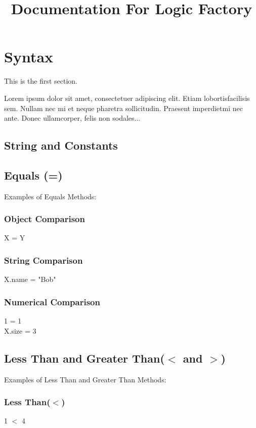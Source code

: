 \documentclass{article}
\title{Documentation For Logic Factory}
\date{ }
\begin{document}
	\maketitle
	\tableofcontents
	\newpage
	
	\section{Syntax}
	
	This is the first section.
	
	Lorem  ipsum  dolor  sit  amet,  consectetuer  adipiscing  
	elit.   Etiam  lobortisfacilisis sem.  Nullam nec mi et 
	neque pharetra sollicitudin.  Praesent imperdietmi nec ante. 
	Donec ullamcorper, felis non sodales...

	\subsection{String and Constants}
	
	\subsection{Equals (=)}
	Examples of Equals Methods:
	
	\subsubsection*{Object Comparison}
	X = Y
	
	\subsubsection*{String Comparison}
	X.name = "Bob"
	
	\subsubsection*{Numerical Comparison}
	1 = 1 \\
	X.size = 3
	
	\subsection {Less Than and Greater Than($<$ and $>$)}
	Examples of Less Than and Greater Than Methods:
	
	\subsubsection*{Less Than($<$)}
	1 $<$ 4
	
\end{document}
